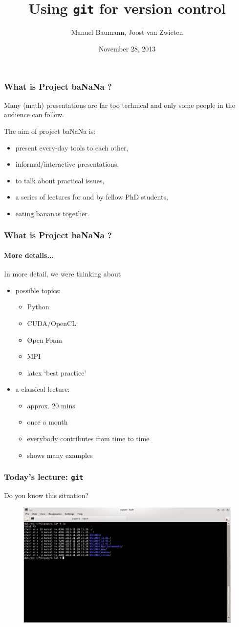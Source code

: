 \documentclass{beamer}
\title{\LARGE{Using \texttt{git} for version control}}
\author{Manuel Baumann, Joost van Zwieten}
\date{November 28, 2013}
\begin{document}
\frame{\titlepage}
\begin{frame}
\frametitle{What is Project baNaNa ?}
Many (math) presentations are far too technical and only some people in the audience can follow.

The aim of project baNaNa is:
\begin{itemize}
 \item present every-day tools to each other,
 \pause
 \item informal/interactive presentations,
 \pause
 \item to talk about practical issues,
 \pause
 \item a series of lectures for and by fellow PhD students,
 \pause
 \item eating bananas together.
\end{itemize}
\end{frame}

\begin{frame}
\frametitle{What is Project baNaNa ?}
\framesubtitle{More details...}
In more detail, we were thinking about
\begin{itemize}
 \item possible topics:
 \begin{itemize}
 \item Python
 \item CUDA/OpenCL
 \item Open Foam
 \item MPI
 \item latex `best practice'
 \end{itemize}
 \item a classical lecture:
  \begin{itemize}
 \item approx. 20 mins
 \item once a month
 \item everybody contributes from time to time
 \item shows many examples
 \end{itemize}
\end{itemize}
\end{frame}
\begin{frame}
\frametitle{Today's lecture: \texttt{git}}
Do you know this situation?
\begin{figure}
\centering
 \includegraphics[height=0.64\textheight]{images/screenshot.png}
\end{figure}
\end{frame}
\end{document}
